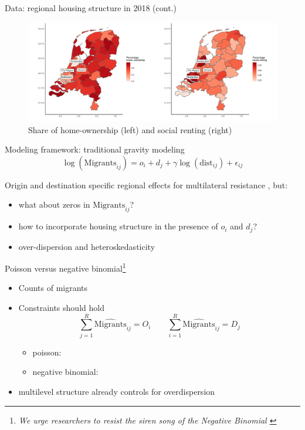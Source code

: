 \documentclass{beamer}
\begin{document}
\begin{frame}{Data: regional housing structure in 2018 (cont.)}
		\begin{figure}
		  \includegraphics[width=1\textwidth]{../../fig/housing_types}
		  \caption{Share of home-ownership (left) and social renting (right)}
		  \end{figure}
\end{frame}


\begin{frame}{Modeling framework: traditional gravity modeling}
	\begin{equation*}
	\log(\text{Migrants}_{ij}) = o_i + d_j + \gamma\log(\text{dist}_{ij}) + \epsilon_{ij}
	\label{eq:gravfixed}
	\end{equation*} 
	
	Origin and destination specific \alert{regional} effects for multilateral resistance  \citep{anderson2003gravity}, but:
	\begin{itemize}
		\item what about \alert{zeros} in $\text{Migrants}_{ij}$?
		\item how to incorporate \alert{housing} structure in the presence of $o_i$ and $d_j$?
		\item \alert{over-dispersion} and \alert{heteroskedasticity} \footnotesize{\citep{silva2006log} }
	\end{itemize}
\end{frame}

\begin{frame}{Poisson versus negative binomial\footnote{
			\emph{We urge researchers to resist the siren song of the Negative
			Binomial \footnotesize{ \citep{head2014gravity}} }
			}}
	
	\begin{itemize}
		\item Counts of migrants\newline 
		\item \alert{Constraints} should hold
		$$
		\sum_{j=1}^{R} {\widehat{\text{Migrants} }_{ij} } = O_i \qquad \sum_{i=1}^{R} {\widehat{\text{Migrants} }_{ij} } = D_j
		$$
		\begin{itemize}
			\item poisson: 
		    \item negative binomial:  \newline
		  \end{itemize}
		  \item multilevel structure already controls for overdispersion
		\end{itemize}

\end{frame}
\end{document}
